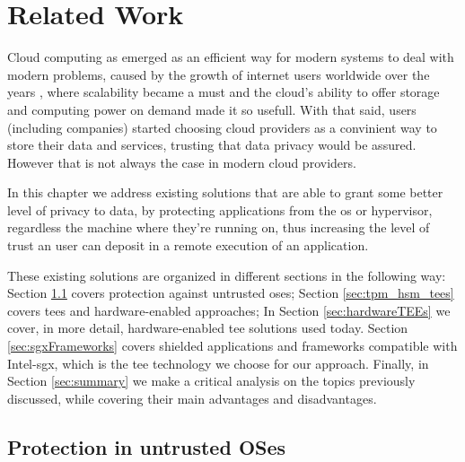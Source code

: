 \chapter{Related Work}
\label{cha:related_work}

Cloud computing as emerged as an efficient way for modern systems to deal with modern problems, caused by the growth of internet users worldwide over the years \cite{growthInternetUsers}, where scalability became a must and the cloud's ability to offer storage and computing power on demand made it so usefull.
With that said, users (including companies) started choosing cloud providers as a convinient way to store their data and services, trusting that data privacy would be assured. However that is not always the case in modern cloud providers. 

In this chapter we address existing solutions that are able to grant some better level of privacy to data, by protecting applications from the \gls{os} or hypervisor, regardless the machine where they're running on, thus increasing the level of trust an user can deposit in a remote execution of an application.

These existing solutions are organized in different sections in the following way: 
Section \ref{sec:protect_untrustOS} covers protection against untrusted \gls{os}es; 
Section \ref{sec:tpm_hsm_tees} covers \gls{tee}s and hardware-enabled approaches;
In Section \ref{sec:hardwareTEEs} we cover, in more detail, hardware-enabled \gls{tee} solutions used today.
Section \ref{sec:sgxFrameworks} covers shielded applications and frameworks compatible with Intel-\gls{sgx}, which is the \gls{tee} technology we choose for our approach.
Finally, in Section \ref{sec:summary} we make a critical analysis on the topics previously discussed, while covering their main advantages and disadvantages.




\section{Protection in untrusted OSes}
\label{sec:protect_untrustOS}

